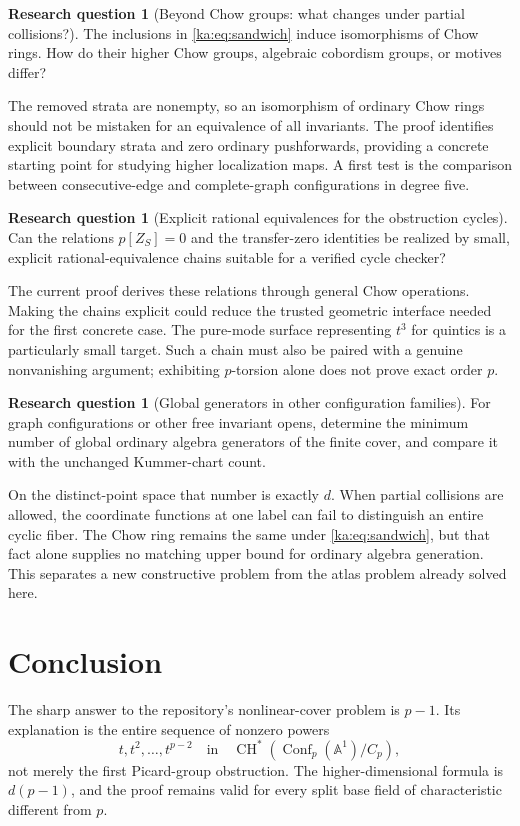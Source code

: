\documentclass[11pt,a4paper]{article}
\theoremstyle{definition}
\newtheorem{question}[theorem]{Research question}
\theoremstyle{remark}
\newcommand{\A}{\mathbb A}
\newcommand{\CH}{\operatorname{CH}}
\newcommand{\Conf}{\operatorname{Conf}}
\begin{document}
\begin{question}[Beyond Chow groups: what changes under partial collisions?]
The inclusions in \eqref{ka:eq:sandwich} induce isomorphisms of Chow rings.
How do their higher Chow groups, algebraic cobordism groups, or motives
differ?
\end{question}
The removed strata are nonempty, so an isomorphism of ordinary Chow
rings should not be mistaken for an equivalence of all invariants.
The proof identifies explicit boundary strata and zero ordinary
pushforwards, providing a concrete starting point for studying higher
localization maps. A first test is the comparison between consecutive-edge
and complete-graph configurations in degree five.

\begin{question}[Explicit rational equivalences for the obstruction cycles]
Can the relations $p[Z_S]=0$ and the transfer-zero identities be realized
by small, explicit rational-equivalence chains suitable for a verified
cycle checker?
\end{question}
The current proof derives these relations through general Chow
operations. Making the chains explicit could reduce the trusted
geometric interface needed for the first concrete case. The pure-mode
surface representing $t^3$ for quintics is a particularly small target.
Such a chain must also be paired with a genuine nonvanishing argument;
exhibiting $p$-torsion alone does not prove exact order $p$.

\begin{question}[Global generators in other configuration families]
For graph configurations or other free invariant opens, determine the
minimum number of global ordinary algebra generators of the finite
cover, and compare it with the unchanged Kummer-chart count.
\end{question}
On the distinct-point space that number is exactly $d$. When partial
collisions are allowed, the coordinate functions at one label can fail
to distinguish an entire cyclic fiber. The Chow ring remains the same
under \eqref{ka:eq:sandwich}, but that fact alone supplies no matching
upper bound for ordinary algebra generation. This separates a new
constructive problem from the atlas problem already solved here.

\section{Conclusion}
\label{ka:sec:conclusion}
The sharp answer to the repository's nonlinear-cover problem is
$p-1$. Its explanation is the entire sequence of nonzero powers
\[
 t,t^2,\ldots,t^{p-2}
 \quad\text{in}\quad
 \CH^*(\Conf_p(\A^1)/C_p),
\]
not merely the first Picard-group obstruction. The higher-dimensional
formula is $d(p-1)$, and the proof remains valid for every split base
field of characteristic different from $p$.
\end{document}
